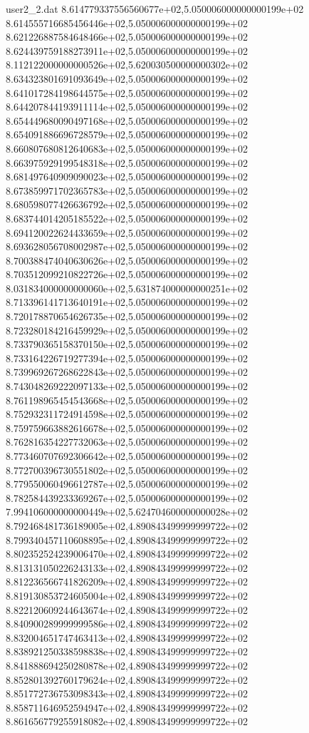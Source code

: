 \begin{filecontents}{user2_2.dat}
8.614779337556560677e+02,5.050006000000000199e+02
8.614555716685456446e+02,5.050006000000000199e+02
8.621226887584648466e+02,5.050006000000000199e+02
8.624439759188273911e+02,5.050006000000000199e+02
8.112122000000000526e+02,5.620030500000000302e+02
8.634323801691093649e+02,5.050006000000000199e+02
8.641017284198644575e+02,5.050006000000000199e+02
8.644207844193911114e+02,5.050006000000000199e+02
8.654449680090497168e+02,5.050006000000000199e+02
8.654091886696728579e+02,5.050006000000000199e+02
8.660807680812640683e+02,5.050006000000000199e+02
8.663975929199548318e+02,5.050006000000000199e+02
8.681497640909090023e+02,5.050006000000000199e+02
8.673859971702365783e+02,5.050006000000000199e+02
8.680598077426636792e+02,5.050006000000000199e+02
8.683744014205185522e+02,5.050006000000000199e+02
8.694120022624433659e+02,5.050006000000000199e+02
8.693628056708002987e+02,5.050006000000000199e+02
8.700388474040630626e+02,5.050006000000000199e+02
8.703512099210822726e+02,5.050006000000000199e+02
8.031834000000000060e+02,5.631874000000000251e+02
8.713396141713640191e+02,5.050006000000000199e+02
8.720178870654626735e+02,5.050006000000000199e+02
8.723280184216459929e+02,5.050006000000000199e+02
8.733790365158370150e+02,5.050006000000000199e+02
8.733164226719277394e+02,5.050006000000000199e+02
8.739969267268622843e+02,5.050006000000000199e+02
8.743048269222097133e+02,5.050006000000000199e+02
8.761198965454543668e+02,5.050006000000000199e+02
8.752932311724914598e+02,5.050006000000000199e+02
8.759759663882616678e+02,5.050006000000000199e+02
8.762816354227732063e+02,5.050006000000000199e+02
8.773460707692306642e+02,5.050006000000000199e+02
8.772700396730551802e+02,5.050006000000000199e+02
8.779550060496612787e+02,5.050006000000000199e+02
8.782584439233369267e+02,5.050006000000000199e+02
7.994106000000000449e+02,5.624704600000000028e+02
8.792468481736189005e+02,4.890843499999999722e+02
8.799340457110608895e+02,4.890843499999999722e+02
8.802352524239006470e+02,4.890843499999999722e+02
8.813131050226243133e+02,4.890843499999999722e+02
8.812236566741826209e+02,4.890843499999999722e+02
8.819130853724605004e+02,4.890843499999999722e+02
8.822120609244643674e+02,4.890843499999999722e+02
8.840900289999999586e+02,4.890843499999999722e+02
8.832004651747463413e+02,4.890843499999999722e+02
8.838921250338598838e+02,4.890843499999999722e+02
8.841888694250280878e+02,4.890843499999999722e+02
8.852801392760179624e+02,4.890843499999999722e+02
8.851772736753098343e+02,4.890843499999999722e+02
8.858711646952594947e+02,4.890843499999999722e+02
8.861656779255918082e+02,4.890843499999999722e+02

\end{filecontents}
